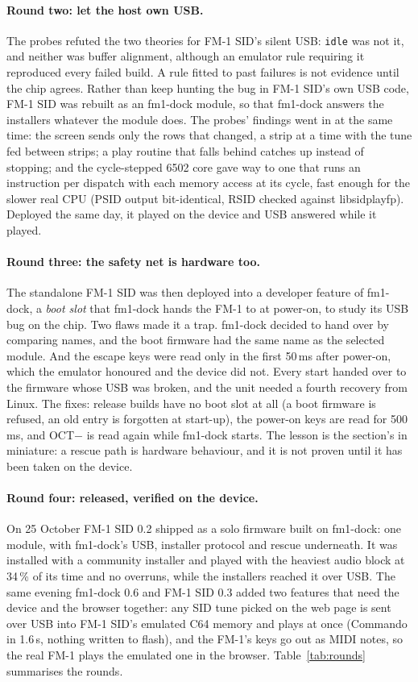 \documentclass[10pt,a4paper]{article}
\newcommand{\code}[1]{\texttt{#1}}
\begin{document}
\paragraph{Round two: let the host own USB.} The probes refuted the two theories for FM-1 SID's silent
USB: \code{idle} was not it, and neither was buffer alignment, although an emulator rule requiring it
reproduced every failed build. A rule fitted to past failures is not evidence until the chip agrees.
Rather than keep hunting the bug in FM-1 SID's own USB code, FM-1 SID was rebuilt as an fm1-dock
module, so that fm1-dock answers the installers whatever the module does. The probes' findings went
in at the same time: the screen sends only the rows that changed, a strip at a time with the tune fed
between strips; a play routine that falls behind catches up instead of stopping; and the
cycle-stepped 6502 core gave way to one that runs an instruction per dispatch with each memory access
at its cycle, fast enough for the slower real CPU (PSID output bit-identical, RSID checked against
libsidplayfp). Deployed the same day, it played on the device and USB answered while it played.

\paragraph{Round three: the safety net is hardware too.} The standalone FM-1 SID was then deployed into
a developer feature of fm1-dock, a \emph{boot slot} that fm1-dock hands the FM-1 to at power-on, to
study its USB bug on the chip. Two flaws made it a trap. fm1-dock decided to hand over by comparing
names, and the boot firmware had the same name as the selected module. And the escape keys were read
only in the first 50\,ms after power-on, which the emulator honoured and the device did not. Every
start handed over to the firmware whose USB was broken, and the unit needed a fourth recovery from
Linux. The fixes: release builds have no boot slot at all (a boot firmware is refused, an old entry is
forgotten at start-up), the power-on keys are read for 500\,ms, and OCT$-$ is read again while
fm1-dock starts. The lesson is the section's in miniature: a rescue path is hardware behaviour, and
it is not proven until it has been taken on the device.

\paragraph{Round four: released, verified on the device.} On 25 October FM-1 SID 0.2 shipped as a
solo firmware built on fm1-dock: one module, with fm1-dock's USB, installer protocol and rescue
underneath. It was installed with a community installer and played with the heaviest audio block at
34\,\% of its time and no overruns, while the installers reached it over USB. The same evening
fm1-dock 0.6 and FM-1 SID 0.3 added two features that need the device and the browser together: any
SID tune picked on the web page is sent over USB into FM-1 SID's emulated C64 memory and plays at once
(Commando in 1.6\,s, nothing written to flash), and the FM-1's keys go out as MIDI notes, so the real
FM-1 plays the emulated one in the browser. Table~\ref{tab:rounds} summarises the rounds.
\end{document}
